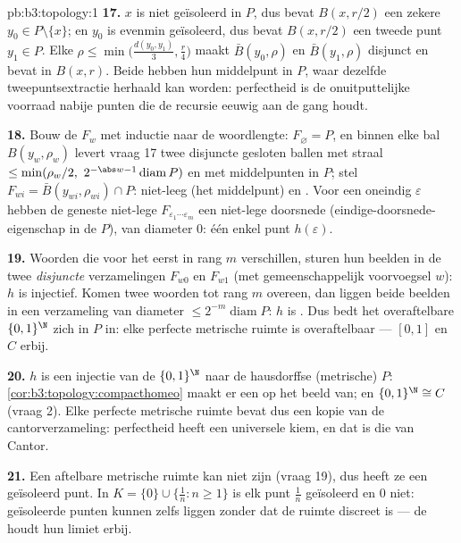 \begin{solution}{pb:b3:topology:1}
\textbf{17.} $x$ is niet geïsoleerd in $P$, dus bevat $B(x, r/2)$
een zekere $y_0 \in P \setminus \{x\}$; en $y_0$ is evenmin
geïsoleerd, dus bevat $B(x, r/2)$ een tweede punt $y_1 \in P$.
Elke $\rho \leq \min\bigl(\frac{d(y_0,y_1)}3, \frac r4\bigr)$
maakt $\bar B(y_0, \rho)$ en $\bar B(y_1, \rho)$ disjunct en
bevat in $B(x, r)$. Beide hebben hun middelpunt in $P$, waar
dezelfde tweepuntsextractie herhaald kan worden: perfectheid is de
onuitputtelijke voorraad nabije punten die de recursie eeuwig aan
de gang houdt.

\textbf{18.} Bouw de $F_w$ met inductie naar de woordlengte:
$F_\varnothing = P$, en binnen elke bal $B(y_w, \rho_w)$ levert
vraag 17 twee disjuncte gesloten ballen met straal $\leq
\min(\rho_w/2,\ 2^{-\abs w-1}\operatorname{diam}P)$ en met
middelpunten in $P$; stel $F_{wi} = \bar B(y_{wi}, \rho_{wi}) \cap
P$: niet-leeg (het middelpunt) en . Voor een oneindig
$\varepsilon$ hebben de geneste niet-lege 
$F_{\varepsilon_1\cdots\varepsilon_m}$ een niet-lege doorsnede
(eindige-doorsnede-eigenschap in de  $P$), van diameter
$0$: één enkel punt $h(\varepsilon)$.

\textbf{19.} Woorden die voor het eerst in rang $m$ verschillen,
sturen hun beelden in de twee \emph{disjuncte} verzamelingen
$F_{w0}$ en $F_{w1}$ (met gemeenschappelijk voorvoegsel $w$): $h$
is injectief. Komen twee woorden tot rang $m$ overeen, dan liggen
beide beelden in een verzameling van diameter $\leq
2^{-m}\operatorname{diam}P$: $h$ is . Dus bedt het
overaftelbare $\{0,1\}^\N$ zich in $P$ in: elke perfecte 
metrische ruimte is overaftelbaar --- $[0,1]$ en $C$ erbij.

\textbf{20.} $h$ is een  injectie van de 
$\{0,1\}^\N$ naar de hausdorffse (metrische) $P$:
\cref{cor:b3:topology:compacthomeo} maakt er een  op
het beeld van; en $\{0,1\}^\N \cong C$ (vraag 2). Elke perfecte
 metrische ruimte bevat dus een kopie van de
cantorverzameling: perfectheid heeft een universele kiem, en dat
is die van Cantor.

\textbf{21.} Een aftelbare  metrische ruimte kan niet
 zijn (vraag 19), dus heeft ze een geïsoleerd punt. In $K =
\{0\}\cup\{\frac1n : n \geq 1\}$ is elk punt $\frac1n$ geïsoleerd
en $0$ niet: geïsoleerde punten kunnen zelfs  liggen zonder
dat de ruimte discreet is --- de  houdt hun limiet
erbij.


\end{solution}
